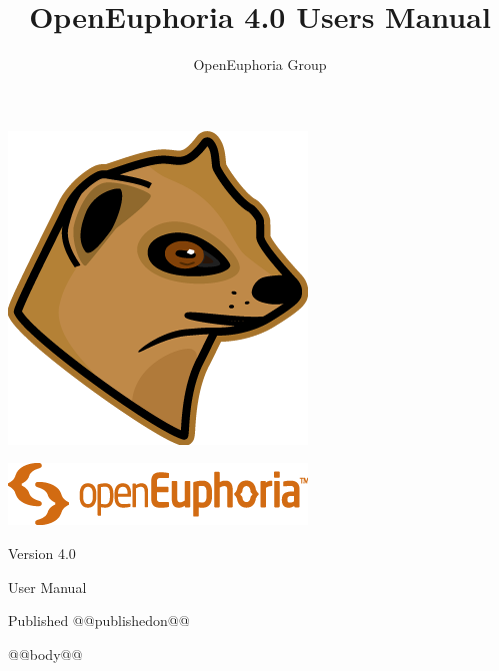 \documentclass[openany]{book}
\begin{document}
\frontmatter
\title{OpenEuphoria 4.0 Users Manual}
\author{OpenEuphoria Group}
{\centering%
  \includegraphics{images/300px-mongoose-head-colour-V2-R0.png}%
  \par\vspace*{40pt}%
  \includegraphics{images/300px-Logo-Logotype-orange-V2-R0.png}%
  \par{\fontsize{28}{36}\selectfont Version 4.0}%
  \vspace*{90pt}%
  \par{\fontsize{48}{58}\selectfont User Manual}%
  \vspace*{12pt}%
  \par{Published @@publishedon@@}%
  \newpage%
}

\setcounter{tocdepth}{1}
\tableofcontents

\pagestyle{fancy}
\mainmatter

@@body@@
\end{document}
